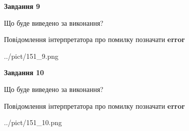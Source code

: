\documentclass[12pt, ukrainian]{article}
\begin{document}
{{\begin {center}\textbf{Завдання 9}\end {center}}\par
Що буде виведено за виконання? \par
Повідомлення інтерпретатора про помилку позначати \textbf{error}

\begin{center}
	{../pict/151_9.png}
\end{center}
\newpage

{\begin {center}\textbf{Завдання 10}\end {center}}\par
Що буде виведено за виконання? \par
Повідомлення інтерпретатора про помилку позначати \textbf{error}

\begin{center}
	{../pict/151_10.png}
\end{center}
\newpage

}
\end{document}
